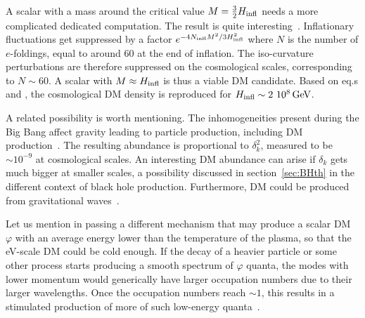 A scalar with a mass around the critical value $M = \frac32 H_{\rm infl}$ needs a more complicated dedicated computation. The result is quite interesting~\cite{Tenkanen}.
Inflationary fluctuations get suppressed by a factor $e^{-4 N_{\rm infl} M^2/3H_{\rm infl}^2}$
where $N$ is the number of $e$-foldings, equal to around $60$ at the end of inflation.
The iso-curvature perturbations are therefore suppressed on the cosmological scales, corresponding to $N\sim 60$.
A scalar with $M \approx H_{\rm infl}$ is thus a viable DM candidate.
Based on eq.s and , the cosmological DM density is reproduced for $H_{\rm infl} \sim 2~10^8\,{\rm GeV}$.

\medskip


A related possibility is worth mentioning.
The inhomogeneities present during the Big Bang affect gravity
leading to particle production, including DM production~\cite{DMprodino}.
The resulting abundance is proportional to $\delta_k^2$, 
measured to be $\sim 10^{-9}$ at cosmological scales. 
An interesting DM abundance can arise if $\delta_k$ gets much bigger at smaller scales,
a possibility discussed in section~\ref{sec:BHth} in the different context of black hole production.
Furthermore, DM could be produced from gravitational waves~\cite{2412.09490}.





\medskip

Let us mention in passing a different mechanism that may produce a scalar DM $\varphi$ 
with an average energy lower than the temperature of the plasma, so that the eV-scale DM could be cold enough.
If the decay of a heavier particle or some other process starts producing a smooth spectrum of $\varphi$ quanta,
the modes with lower momentum would generically have larger occupation numbers due to their larger wavelengths. Once the occupation numbers reach $\sim 1$, this results in 
a stimulated production of more of such low-energy quanta~\cite{2301.08735}.







